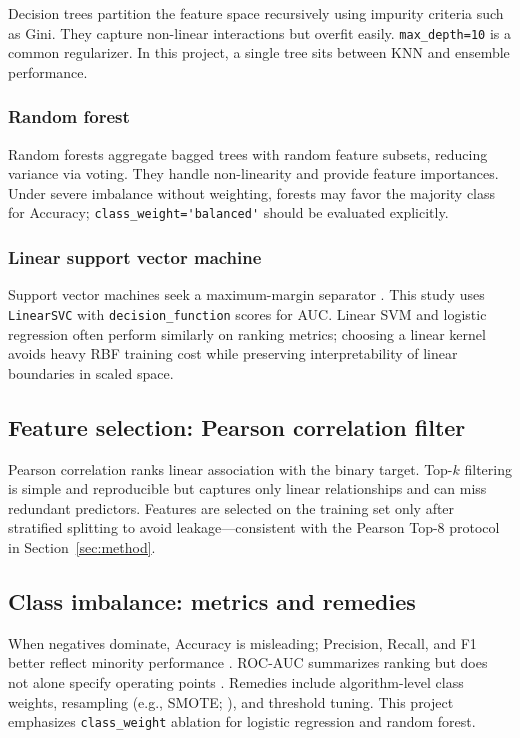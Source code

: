 \documentclass[11pt,a4paper]{article}
\begin{document}
Decision trees partition the feature space recursively using impurity criteria such as Gini. They capture non-linear interactions but overfit easily. \lstinline{max_depth=10} is a common regularizer. In this project, a single tree sits between KNN and ensemble performance.

\subsubsection{Random forest}

Random forests \citep{Breiman2001} aggregate bagged trees with random feature subsets, reducing variance via voting. They handle non-linearity and provide feature importances. Under severe imbalance without weighting, forests may favor the majority class for Accuracy; \lstinline{class_weight='balanced'} should be evaluated explicitly.

\subsubsection{Linear support vector machine}

Support vector machines seek a maximum-margin separator \citep{Cortes1995}. This study uses \lstinline{LinearSVC} with \lstinline{decision_function} scores for AUC. Linear SVM and logistic regression often perform similarly on ranking metrics; choosing a linear kernel avoids heavy RBF training cost while preserving interpretability of linear boundaries in scaled space.

\subsection{Feature selection: Pearson correlation filter}\label{sec:theory-pearson}

Pearson correlation ranks linear association with the binary target. Top-$k$ filtering is simple and reproducible but captures only linear relationships and can miss redundant predictors. Features are selected on the training set only after stratified splitting to avoid leakage---consistent with the Pearson Top-8 protocol in Section~\ref{sec:method}.

\subsection{Class imbalance: metrics and remedies}\label{sec:theory-imbalance}

When negatives dominate, Accuracy is misleading; Precision, Recall, and F1 better reflect minority performance \citep{He2009}. ROC-AUC summarizes ranking but does not alone specify operating points \citep{Fawcett2006}. Remedies include algorithm-level class weights, resampling (e.g., SMOTE; \citealp{Chawla2002}), and threshold tuning. This project emphasizes \lstinline{class_weight} ablation for logistic regression and random forest.
\end{document}

